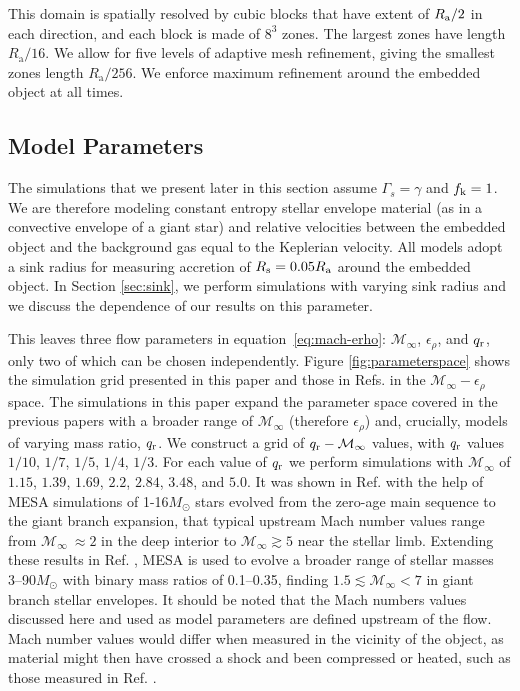 This domain is spatially resolved by  cubic blocks that have extent of $R_{\rm a}/2$ in each direction, and each block is made of $8^3$ zones. The largest zones have length $R_{\mathrm{a}}/16$. We allow for five levels of adaptive mesh refinement, giving the smallest zones length $R_{\mathrm{a}}/256$. We enforce maximum refinement around the embedded object at all times.  


\subsection{Model Parameters}

The simulations that we present later in this section assume $\Gamma_s = \gamma$ and $f_{\rm k} = 1$. We are therefore modeling constant entropy stellar envelope material (as in a convective envelope of a giant star) and relative velocities between the embedded object and the background gas equal to the Keplerian velocity. All models adopt a sink radius for measuring accretion of $R_{\rm s} = 0.05R_{\mathrm{a}}$ around the embedded object. In Section \ref{sec:sink}, we perform simulations with varying sink radius and we discuss the dependence of our results on this parameter. 

This leaves three flow parameters in equation~\eqref{eq:mach-erho}: $\mathcal{M}_\infty$, $\epsilon_\rho$, and $q_{\rm r}$, only two of which can be chosen independently. Figure \ref{fig:parameterspace} shows the simulation grid presented in this paper and those in Refs. \cite{MacLeod:2014yda,MacLeod:2017} in the $\mathcal{M}_\infty - \epsilon_\rho$ space. The simulations in this paper expand the parameter space covered in the previous papers with a broader range of $\mathcal{M}_\infty$ (therefore $\epsilon_\rho$) and, crucially, models of varying mass ratio, $q_{\rm r}$. We construct a grid of $q_{\rm r} - \mathcal{M}_\infty$ values, with $q_{\rm r}$ values $1/10$, $1/7$, $1/5$, $1/4$, $1/3$. For each value of $q_{\rm r}$ we perform simulations with $\mathcal{M}_\infty$ of $1.15$, $1.39$, $1.69$, $2.2$, $2.84$, $3.48$, and $5.0$. It was shown in Ref. \cite{MacLeod_2015} with the help of MESA simulations of 1-16$M_\odot$ stars evolved from the zero-age main sequence to the giant branch expansion, that typical upstream Mach number values range from $\mathcal{M}_\infty~\approx 2$ in the deep interior to $\mathcal{M}_\infty \gtrsim 5$ near the stellar limb. Extending these results in Ref. \cite{Rosa:2020}, MESA is used to evolve a broader range of stellar masses 3--90$M_\odot$ with binary mass ratios of 0.1--0.35, finding $1.5 \lesssim \mathcal{M}_\infty < 7$ in giant branch stellar envelopes. It should be noted that the Mach numbers values discussed here and used as model parameters are defined upstream of the flow. Mach number values would differ when measured in the vicinity of the object, as material might then have crossed a shock and been compressed or heated, such as those measured in Ref. \cite{Iaconi:2018}.

